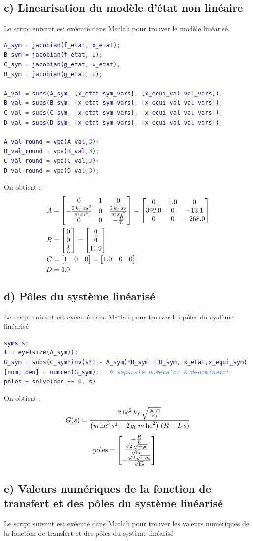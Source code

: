 \subsection{c) Linearisation du modèle d'état non linéaire}
Le script suivant est exécuté dans Matlab pour trouver le modèle linéarisé.
\begin{lstlisting}[language=Matlab]
% Define the state-space representation
A_sym = jacobian(f_etat, x_etat);
B_sym = jacobian(f_etat, u);
C_sym = jacobian(g_etat, x_etat);
D_sym = jacobian(g_etat, u);

A_val = subs(A_sym, [x_etat sym_vars], [x_equi_val val_vars]);
B_val = subs(B_sym, [x_etat sym_vars], [x_equi_val val_vars]);
C_val = subs(C_sym, [x_etat sym_vars], [x_equi_val val_vars]);
D_val = subs(D_sym, [x_etat sym_vars], [x_equi_val val_vars]);

A_val_round = vpa(A_val,3);
B_val_round = vpa(B_val,3);
C_val_round = vpa(C_val,3);
D_val_round = vpa(D_val,3);
\end{lstlisting}


On obtient :
\begin{align}
    A &=\begin{bmatrix} 0 & 1 & 0\\ -\frac{2\,k_f\,{x_{3}}^2}{m\,{x_{1}}^3} & 0 & \frac{2\,k_f\,x_{3}}{m\,{x_{1}}^2}\\ 0 & 0 & -\frac{R}{L} \end{bmatrix}=\begin{bmatrix} 0 & 1.0 & 0\\ 392.0 & 0 & -13.1\\ 0 & 0 & -268.0 \end{bmatrix} \\
    B &=\begin{bmatrix} 0\\ 0\\ \frac{1}{L} \end{bmatrix}=\begin{bmatrix} 0\\ 0\\ 11.9 \end{bmatrix} \\
    C &=\begin{bmatrix} 1 & 0 & 0 \end{bmatrix}=\begin{bmatrix} 1.0 & 0 & 0 \end{bmatrix} \\
    D &=0.0
\end{align}


\subsection{d) Pôles du système linéarisé}

Le script suivant est exécuté dans Matlab pour trouver les pôles du système linéarisé
\begin{lstlisting}[language=Matlab]
syms s;
I = eye(size(A_sym));
G_sym = subs(C_sym*inv(s*I - A_sym)*B_sym + D_sym, x_etat,x_equi_sym)
[num, den] = numden(G_sym);   % separate numerator & denominator
poles = solve(den == 0, s)
\end{lstlisting}

On obtient :
\begin{align}
    G(s) &= \frac{2\,{\mathrm{he}}^2\,k_f\,\sqrt{\frac{g_{0}\,m}{k_f}}}{\left(m\,{\mathrm{he}}^3\,s^2+2\,g_{0}\,m\,{\mathrm{he}}^2\right)\,\left(R+L\,s\right)} \\
\end{align}
\begin{align}
    \text{poles} &=\begin{bmatrix} -\frac{R}{L}\\ \frac{\sqrt{2}\,\sqrt{-g_{0}}}{\sqrt{\mathrm{he}}}\\ -\frac{\sqrt{2}\,\sqrt{-g_{0}}}{\sqrt{\mathrm{he}}} \end{bmatrix}
\end{align}

\subsection{e) Valeurs numériques de la fonction de transfert et des pôles du système linéarisé}
Le script suivant est exécuté dans Matlab pour trouver les valeurs numériques de la fonction de transfert et des pôles du système linéarisé

